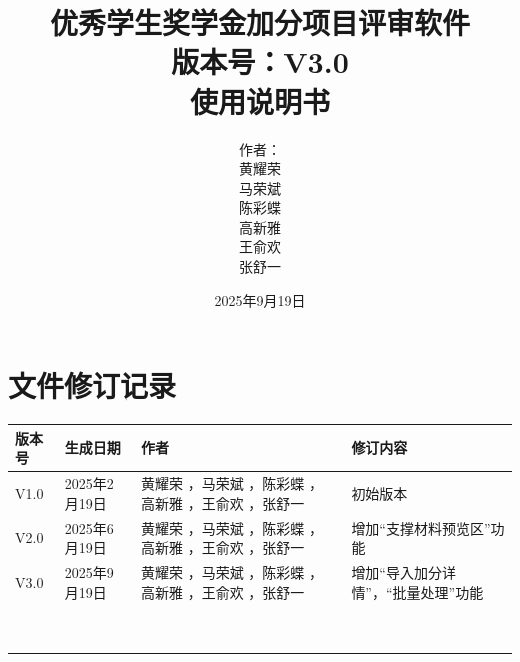 \documentclass[12pt]{report}
\begin{document}
	
	\title{\textbf{优秀学生奖学金加分项目评审软件}\\\textbf{版本号：V3.0}\\\textbf{使用说明书}}
	\author{作者：\\黄耀荣\\马荣斌\\陈彩蝶\\高新雅\\王俞欢\\张舒一} 
	\date{2025年9月19日}    %
	\maketitle       %

	
	\setcounter{page}{1} %
	\tableofcontents      %
	
	\chapter*{文件修订记录}
	
\renewcommand{\arraystretch}{1.5} %

\begin{center}
	\begin{tabular}{ | m{1.5cm}<{\centering}|m{4cm}<{\centering} | m{5cm}<{\centering} | m{3.5cm}<{\centering} |}
		\hline
	版本号 & 生成日期 & 作者 & 修订内容 \\ %
	\hline
	V1.0 & 2025年2月19日 & 黄耀荣 ，马荣斌 ，陈彩蝶 ， 高新雅 ，王俞欢 ，张舒一 & 初始版本 \\ %
	\hline
	V2.0 & 2025年6月19日 & 黄耀荣 ，马荣斌 ，陈彩蝶 ， 高新雅 ，王俞欢 ，张舒一 & 增加“支撑材料预览区”功能 \\ %
	\hline
	V3.0 & 2025年9月19日 & 黄耀荣 ，马荣斌 ，陈彩蝶 ， 高新雅 ，王俞欢 ，张舒一 & 增加“导入加分详情”，“批量处理”功能 \\ %
	\hline
	&  &  &  \\ %
	\hline
	&  &  &  \\ %
	\hline
	&  &  &  \\ %
	\hline
	&  &  &  \\ %
	\hline
		&  &  &  \\ %
	\hline
		&  &  &  \\ %
	\hline
		&  &  &  \\ %
	\hline
		&  &  &  \\ %
	\hline
		&  &  &  \\ %
	\hline
\end{tabular}
\end{center}
\end{document}
